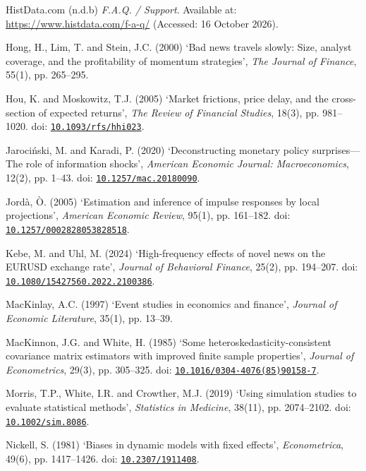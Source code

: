 {\noindent\hangindent=16pt\hypertarget{ref:histdata-b}{}HistData.com (n.d.b) \textit{F.A.Q. / Support}. Available at: \url{https://www.histdata.com/f-a-q/} (Accessed: 16 October 2026).\par
\noindent\hangindent=16pt\hypertarget{ref:hong2000}{}Hong, H., Lim, T. and Stein, J.C. (2000) ‘Bad news travels slowly: Size, analyst coverage, and the profitability of momentum strategies’, \textit{The Journal of Finance}, 55(1), pp. 265–295.\par
\noindent\hangindent=16pt\hypertarget{ref:hou2005}{}Hou, K. and Moskowitz, T.J. (2005) ‘Market frictions, price delay, and the cross-section of expected returns’, \textit{The Review of Financial Studies}, 18(3), pp. 981–1020. doi: \href{https://doi.org/10.1093/rfs/hhi023}{\nolinkurl{10.1093/rfs/hhi023}}.\par
\noindent\hangindent=16pt\hypertarget{ref:jarocinski2020}{}Jarociński, M. and Karadi, P. (2020) ‘Deconstructing monetary policy surprises—The role of information shocks’, \textit{American Economic Journal: Macroeconomics}, 12(2), pp. 1–43. doi: \href{https://doi.org/10.1257/mac.20180090}{\nolinkurl{10.1257/mac.20180090}}.\par
\noindent\hangindent=16pt\hypertarget{ref:jorda2005}{}Jordà, Ò. (2005) ‘Estimation and inference of impulse responses by local projections’, \textit{American Economic Review}, 95(1), pp. 161–182. doi: \href{https://doi.org/10.1257/0002828053828518}{\nolinkurl{10.1257/0002828053828518}}.\par
\noindent\hangindent=16pt\hypertarget{ref:kebe2024}{}Kebe, M. and Uhl, M. (2024) ‘High-frequency effects of novel news on the EURUSD exchange rate’, \textit{Journal of Behavioral Finance}, 25(2), pp. 194–207. doi: \href{https://doi.org/10.1080/15427560.2022.2100386}{\nolinkurl{10.1080/15427560.2022.2100386}}.\par
\noindent\hangindent=16pt\hypertarget{ref:mackinlay1997}{}MacKinlay, A.C. (1997) ‘Event studies in economics and finance’, \textit{Journal of Economic Literature}, 35(1), pp. 13–39.\par
\noindent\hangindent=16pt\hypertarget{ref:mackinnon1985}{}MacKinnon, J.G. and White, H. (1985) ‘Some heteroskedasticity-consistent covariance matrix estimators with improved finite sample properties’, \textit{Journal of Econometrics}, 29(3), pp. 305–325. doi: \href{https://doi.org/10.1016/0304-4076(85)90158-7}{\nolinkurl{10.1016/0304-4076(85)90158-7}}.\par
\noindent\hangindent=16pt\hypertarget{ref:morris2019}{}Morris, T.P., White, I.R. and Crowther, M.J. (2019) ‘Using simulation studies to evaluate statistical methods’, \textit{Statistics in Medicine}, 38(11), pp. 2074–2102. doi: \href{https://doi.org/10.1002/sim.8086}{\nolinkurl{10.1002/sim.8086}}.\par
\noindent\hangindent=16pt\hypertarget{ref:nickell1981}{}Nickell, S. (1981) ‘Biases in dynamic models with fixed effects’, \textit{Econometrica}, 49(6), pp. 1417–1426. doi: \href{https://doi.org/10.2307/1911408}{\nolinkurl{10.2307/1911408}}.\par
}
